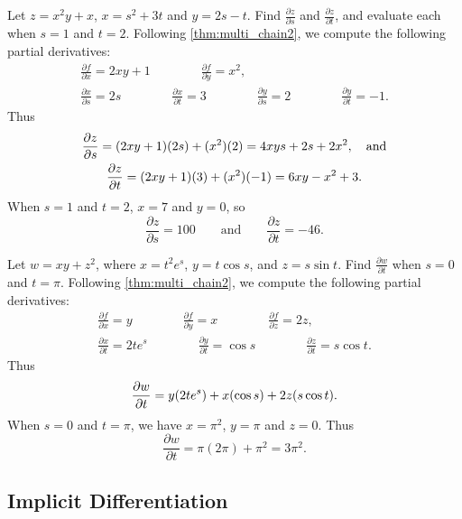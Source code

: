 
\begin{example}\label{ex_mchain3}%
Let $z=x^2y+x$, $x=s^2+3t$ and $y=2s-t$. Find $\frac{\partial z}{\partial s}$ and $\frac{\partial z}{\partial t}$, and evaluate each when $s=1$ and $t=2$.
\solution
Following \autoref{thm:multi_chain2}, we compute the following partial derivatives:
\begin{gather*}
\frac{\partial f}{\partial x} = 2xy+1\qquad\qquad \frac{\partial f}{\partial y} = x^2,\\
\frac{\partial x}{\partial s} = 2s \qquad\qquad \frac{\partial x}{\partial t} = 3\qquad\qquad \frac{\partial y}{\partial s} = 2 \qquad\qquad \frac{\partial y}{\partial t} = -1.
\end{gather*}
Thus 
\begin{gather*}
\displaystyle \frac{\partial z}{\partial s} = (2xy+1)(2s) + (x^2)(2) = 4xys+2s + 2x^2,\quad \text{and}\\
\displaystyle \frac{\partial z}{\partial t} = (2xy+1)(3) + (x^2)(-1) = 6xy-x^2+3.
\end{gather*}
When $s=1$ and $t=2$, $x= 7$ and $y= 0$, so 
\[\frac{\partial z}{\partial s} = 100\qquad \text{and}\qquad \frac{\partial z}{\partial t} = -46.\]
\end{example}

\begin{example}\label{ex_mchain4}%
Let $w = xy+z^2$, where $x= t^2e^s$, $y= t\cos s$, and $z=s\sin t$. Find $\frac{\partial w}{\partial t}$ when $s=0$ and $t=\pi$.
\solution
Following \autoref{thm:multi_chain2}, we compute the following partial derivatives:
\begin{gather*}
\frac{\partial f}{\partial x} = y\qquad\qquad \frac{\partial f}{\partial y} = x\qquad\qquad \frac{\partial f}{\partial z} = 2z,\\
\frac{\partial x}{\partial t} = 2te^s\qquad\qquad \frac{\partial y}{\partial t} = \cos s\qquad\qquad \frac{\partial z}{\partial t} = s\cos t.
\end{gather*}
Thus
\[\displaystyle \frac{\partial w}{\partial t} = y(2te^s) + x(\cos s) + 2z(s\cos t).\] 
When $s=0$ and $t=\pi$, we have $x=\pi^2$, $y=\pi$ and $z=0$. Thus
\[\frac{\partial w}{\partial t} = \pi(2\pi) + \pi^2 = 3\pi^2.\]
\end{example}

\subsection{Implicit Differentiation}

